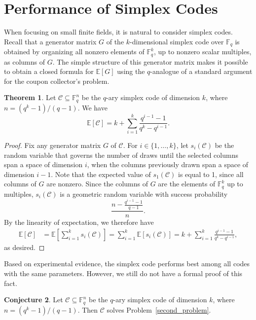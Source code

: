 \documentclass[11pt,a4paper,reqno,twoside]{article}
\theoremstyle{definition}
\newtheorem{theorem}{Theorem}[section]
\newtheorem{conjecture}[theorem]{Conjecture}
\newcommand{\F}{\mathbb{F}}
\newcommand{\E}{\mathbb{E}}
\newcommand{\mC}{\mathcal{C}}
\begin{document}
\section{Performance of Simplex Codes} \label{simplex_section}
When focusing on small finite fields, it is natural to consider simplex codes. Recall that a generator matrix $G$ of the $k$-dimensional simplex code over $\F_q$ is obtained by organizing all nonzero elements of $\F_q^k$, up to nonzero scalar multiples, as columns of $G$. The simple structure of this generator matrix makes it possible to obtain a closed formula for $\E[G]$ using the $q$-analogue of a standard argument for the coupon collector's problem.

\begin{theorem} \label{thm_E_k_simplex}
    Let $\mathcal{C} \subseteq \mathbb{F}_q^n$ be the $q$-ary simplex code of dimension $k$, where $n = (q^k-1)/(q-1)$. We have 
    \begin{equation*} 
    \mathbb{E}[\mathcal{C}] = k + \sum_{i=1}^k \frac{q^{i-1}-1}{q^k - q^{i-1}}.
    \end{equation*}
\end{theorem}
\begin{proof}
    Fix any generator matrix $G$ of $\mC$. For $i \in \{1, \ldots, k\}$, let $s_i(\mC)$ be the random variable that governs the number of draws until the selected columns span a space of dimension $i$, when the columns previously drawn span a space of dimension $i-1$. Note that the expected value of $s_1(\mC)$ is equal to 1, since all columns of $G$ are nonzero.
    Since the columns of $G$ are the elements of $\F_q^k$ up to multiples, 
    $s_i(\mathcal{C})$ is a geometric random variable with success probability
    \[
    \frac{n - \frac{q^{i-1}-1}{q-1}}{n}.
    \]
    By the linearity of expectation, we therefore have
    \[
    \begin{split}
    \mathbb{E}[\mathcal{C}] &= \mathbb{E}\left[ \sum_{i=1}^k s_i(\mathcal{C}) \right] = \sum_{i=1}^k \mathbb{E}[s_i(\mathcal{C})] 
    = k + \sum_{i=1}^k \frac{q^{i-1}-1}{q^k - q^{i-1}},
    \end{split}
    \]
    as desired.
\end{proof}
 

Based on experimental evidence, the simplex code performs best among all codes with the same parameters. However, we still do not have a formal proof of this fact.

\begin{conjecture}
    Let $\mC \subseteq \mathbb{F}_q^n$ be the $q$-ary simplex code of dimension $k$, where $n = (q^k-1)/(q-1)$. Then $\mC$ solves Problem~\ref{second_problem}.
\end{conjecture}
\end{document}
